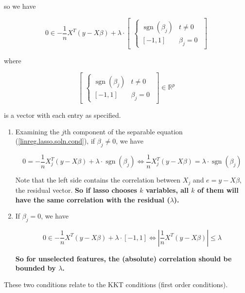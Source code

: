 so we have

\begin{equation}\label{linreg.lasso.soln.cond}
0 \in - \frac{1}{n} X^T(y - X \beta) + \lambda \cdot \begin{bmatrix} \begin{cases}
\operatorname{sgn}(\beta_j) & t \neq 0 \\
[-1, 1] & \beta_j = 0 
\end{cases} \end{bmatrix}
\end{equation}

where 

\[
\begin{bmatrix} \begin{cases}
\operatorname{sgn}(\beta_j) & t \neq 0 \\
[-1, 1] & \beta_j = 0 
\end{cases} \end{bmatrix} \in \mathbb{R}^p
\]

is a vector with each entry as specified.

\begin{remark}
\begin{enumerate}[(1)]
\item Examining the \(j\)th component of the separable equation (\ref{linreg.lasso.soln.cond}), if \(\beta_j \neq 0\), we have

\[
0 = -\frac{1}{n} X_j^T(y - X \beta) + \lambda \cdot
\operatorname{sgn}(\beta_j) \iff \frac{1}{n} X_j^T(y - X \beta) = \lambda \cdot
\operatorname{sgn}(\beta_j) 
\]

Note that the left side contains the correlation between \(X_j\) and \(e = y - X \beta\), the residual vector. \textbf{So if lasso chooses \(k\) variables, all \(k\) of them will have the same correlation with the residual (\(\lambda\)).}

\item If \(\beta_j =0\), we have

\[
0 \in - \frac{1}{n} X^T(y - X \beta) + \lambda \cdot 
[-1, 1]  \iff \left|  \frac{1}{n} X^T(y - X \beta)  \right| \leq \lambda
\]

\textbf{So for unselected features, the (absolute) correlation should be bounded by \(\lambda\).}

\end{enumerate}

\end{remark}

These two conditions relate to the KKT conditions (first order conditions).

